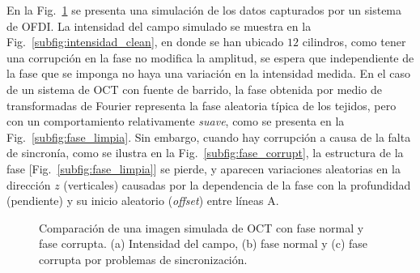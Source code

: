 En la Fig.~\ref{fig:corruptmap} se presenta una simulación de los datos capturados por un sistema de OFDI. La intensidad del campo simulado se muestra en la Fig.~\ref{subfig:intensidad_clean}, en donde se han ubicado $12$ cilindros, como tener una corrupción en la fase no modifica la amplitud, se espera que independiente de la fase que se imponga no haya una variación en la intensidad medida. En el caso de un sistema de OCT con fuente de barrido, la fase obtenida por medio de transformadas de Fourier representa la fase aleatoria típica de los tejidos, pero con un comportamiento relativamente \textit{suave}, como se presenta en la Fig.~\ref{subfig:fase_limpia}. Sin embargo, cuando hay corrupción a causa de la falta de sincronía, como se ilustra en la Fig.~\ref{subfig:fase_corrupt}, la estructura de la fase [Fig.~\ref{subfig:fase_limpia}] se pierde, y aparecen variaciones aleatorias en la dirección $z$ (verticales) causadas por la dependencia de la fase con la profundidad (pendiente) y su inicio aleatorio (\textit{offset}) entre líneas A.

\begin{figure}[h]
	\centering
	\caption[Simulación de volumen de OCT]{Comparación de una imagen simulada de OCT con fase normal y fase corrupta. (a) Intensidad del campo, (b) fase normal y (c) fase corrupta por problemas de sincronización.}
	\label{fig:corruptmap}
\end{figure}

